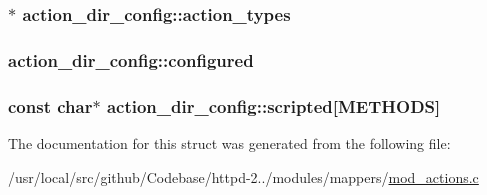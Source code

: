 \subsubsection[{\texorpdfstring{action\+\_\+types}{action_types}}]{$\ast$ action\+\_\+dir\+\_\+config\+::action\+\_\+types}\hypertarget{structaction__dir__config_abc7b17f60748482c1235a01fa921b776}{}\label{structaction__dir__config_abc7b17f60748482c1235a01fa921b776}
\subsubsection[{\texorpdfstring{configured}{configured}}]{ action\+\_\+dir\+\_\+config\+::configured}\hypertarget{structaction__dir__config_a34ca39ab394d5bfac0977359538717de}{}\label{structaction__dir__config_a34ca39ab394d5bfac0977359538717de}
\subsubsection[{\texorpdfstring{scripted}{scripted}}]{\setlength{\rightskip}{0pt plus 5cm}const char$\ast$ action\+\_\+dir\+\_\+config\+::scripted\mbox{[}{\bf M\+E\+T\+H\+O\+DS}\mbox{]}}\hypertarget{structaction__dir__config_ad241cccf1c537c7cf21fab08f487323a}{}\label{structaction__dir__config_ad241cccf1c537c7cf21fab08f487323a}


The documentation for this struct was generated from the following file\+:\begin{DoxyCompactItemize}
\item 
/usr/local/src/github/\+Codebase/httpd-\/2../modules/mappers/\hyperlink{mod__actions_8c}{mod\+\_\+actions.\+c}\end{DoxyCompactItemize}
